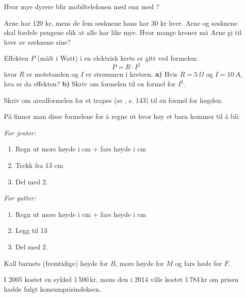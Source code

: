 Hvor mye dyrere blir mobiltelefonen med  enn med ?

\newpage


Arne har 120 kr, mens de fem søsknene hans har 30 kr hver. Arne og søsknene skal fordele pengene slik at alle har like mye. Hvor mange kroner må Arne gi til hver av søsknene sine?

Effekten $ P $ (målt i Watt) i en elektrisk krets er gitt ved formelen:
\[ P=R\cdot I^2 \]
hvor $ R $ er motstanden og $ I $ er strømmen i kretsen.\os
\textbf{a)} Hvis $ {R=5\,\Omega} $ og $ {I=10\,A} $, hva er da effekten?\os
\textbf{b)} Skriv om formelen til en formel for $ I^2 $.

Skriv om arealformelen for et trapes (se \mb, s. 143) til en formel for høgden.

På
 finner man disse formelene for å regne ut hvor høy et barn kommer til å bli:\os

\textit{For jenter:}
\begin{enumerate}
	\item Regn ut mors høyde i cm + fars høyde i cm
	\item Trekk fra 13 cm
	\item Del med 2.
\end{enumerate}

\textit{For gutter:}
\begin{enumerate}
	\item Regn ut mors høyde i cm + fars høyde i cm
	\item Legg til 13 
	\item Del med 2.
\end{enumerate}
Kall barnets (fremtidige) høyde for $ B $, mors høyde for $ M $ og fars høde for $ F $.

I 2005 kostet en sykkel 1\,500\,kr, mens den i 2014 ville kostet 1\,784\,kr om prisen hadde fulgt konsumprisindeksen. \os

